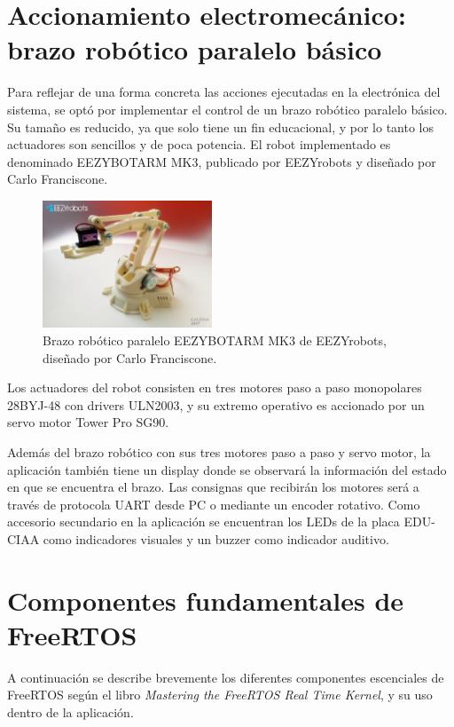 \documentclass{IEEEtran}
\begin{document}
\section{Accionamiento electromecánico: brazo robótico paralelo básico}
Para reflejar de una forma concreta las acciones ejecutadas en la electrónica del sistema, se optó por implementar el control de un brazo robótico paralelo básico. Su tamaño es reducido, ya que solo tiene un fin educacional, y por lo tanto los actuadores son sencillos y de poca potencia. El robot implementado es denominado EEZYBOTARM MK3, publicado por EEZYrobots y diseñado por Carlo Franciscone. 

\begin{figure}[ht]
    \centering
    \includegraphics[width=0.45\textwidth]{../robot_arm.jpg}
    \caption{Brazo robótico paralelo EEZYBOTARM MK3 de EEZYrobots, diseñado por Carlo Franciscone.}
    \label{fig:robot-arm}
\end{figure}

Los actuadores del robot consisten en tres motores paso a paso monopolares 28BYJ-48 con drivers ULN2003, y su extremo operativo es accionado por un servo motor Tower Pro SG90.

Además del brazo robótico con sus tres motores paso a paso y servo motor, la aplicación también tiene un display donde se observará la información del estado en que se encuentra el brazo. Las consignas que recibirán los motores será a través de protocola UART desde PC o mediante un encoder rotativo. Como accesorio secundario en la aplicación se encuentran los LEDs de la placa EDU-CIAA como indicadores visuales y un buzzer como indicador auditivo.

\section{Componentes fundamentales de FreeRTOS}
A continuación se describe brevemente los diferentes componentes escenciales de FreeRTOS según el libro \textit{Mastering the FreeRTOS Real Time Kernel}, y su uso dentro de la aplicación.
\end{document}
